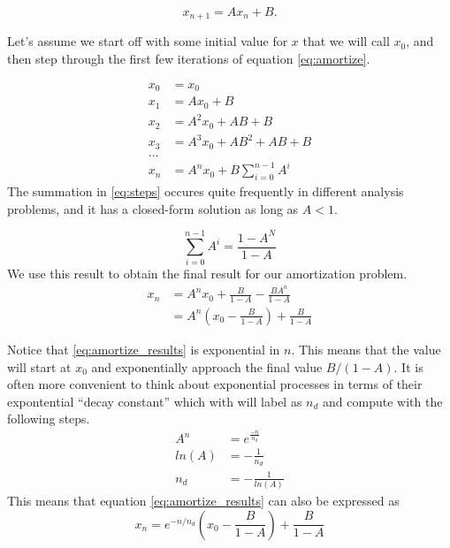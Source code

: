 \documentclass[../../main.tex]{subfiles}
\begin{document}
\begin{equation}
    \label{eq:amortize}
    x_{n+1} = A x_n + B.
\end{equation}

Let's assume we start off with some initial value for $x$ that we will call
$x_0$, and then step through the first few iterations of equation
\eqref{eq:amortize}.

\begin{align}
    \label{eq:steps}
    x_0 &= x_0\nonumber\\
    x_1 &= A x_0 + B\nonumber\\
    x_2 &= A^2 x_0 + AB + B\nonumber\\
    x_3 &= A^3 x_0 + AB^2 + AB + B\nonumber\\
    ...\nonumber\\
    x_n &=
        A^n x_0 +
        B\sum\limits_{i=0}^{n-1}A^i
\end{align}
The summation in \eqref{eq:steps} occures quite frequently in different
analysis problems, and it has a closed-form solution as long as $A < 1$.

\begin{equation}
    \label{eq:summation}
    \sum\limits_{i=0}^{n-1}A^i = \frac{1 - A ^ N}{1 - A}
\end{equation}
We use this result to obtain the final result for our amortization problem.
\begin{align}
    \label{eq:amortize_results}
    x_n &= A^n x_0 + \frac{B}{1 - A} - \frac{B A ^ n}{1 - A} \nonumber\\
        &= A^n \left( x_0 - \frac{B}{1 - A} \right) + \frac{B}{1 - A}
\end{align}

Notice that \eqref{eq:amortize_results} is exponential in $n$.  This means
that the value will start at $x_0$ and exponentially approach the final value
$B / (1-A)$.  It is often more convenient to think about exponential processes
in terms of their expontential ``decay constant'' which with will label as
$n_d$ and compute with the following steps.
\begin{align}
    \label{eq:decay}
    A^n &= e^\frac{-n}{n_d} \nonumber\\
    ln(A) &= -\frac{1}{n_d} \nonumber\\
    n_d &= -\frac{1}{ln(A)}
\end{align}
This means that equation \eqref{eq:amortize_results} can also be expressed as
\begin{equation}
    \label{eq:amortize_results_exp}
    x_n = e^{-n/n_d}
          \left( x_0 - \frac{B}{1 - A} \right) + \frac{B}{1 - A}
\end{equation}
 
\end{document}

